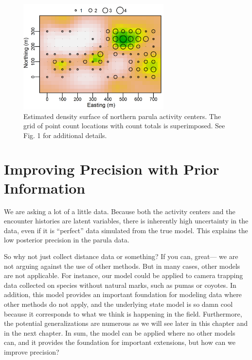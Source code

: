 \begin{figure}
  \centering
  \includegraphics[width=3in,height=2.25in]{Ch18-Unmarked/figs/nopaDen}
  \caption{Estimated density surface of northern parula activity
    centers. The grid of point count locations with count totals is
    superimposed. See Fig. 1 for additional details.  }
  \label{fig:nopaDen}
\end{figure}




\section{Improving Precision with Prior Information}
\label{Sect.precision}

We are asking a lot of a little data. Because both the activity
centers and the encounter histories are latent variables, there is
inherently high uncertainty in the data, even if it is ``perfect''
data simulated from the true model. This explains the low posterior
precision in the parula data.

So why not just collect distance data or something? If you can, great---
we are not arguing against the use of other methods. But in many
cases, other models are not applicable. For instance, our model could
be applied to camera trapping data collected on species without
natural marks, such as pumas or coyotes. In addition, this
model provides an important foundation for modeling data where other
methods do not apply, and the underlying state model is so damn cool
because it corresponds to what we think is happening in the field.
Furthermore, the potential generalizations are numerous as we
will see later in this chapter and in the next chapter. In sum, the
model can be applied where no other models can, and it provides the
foundation for important extensions, but how can we improve precision?

